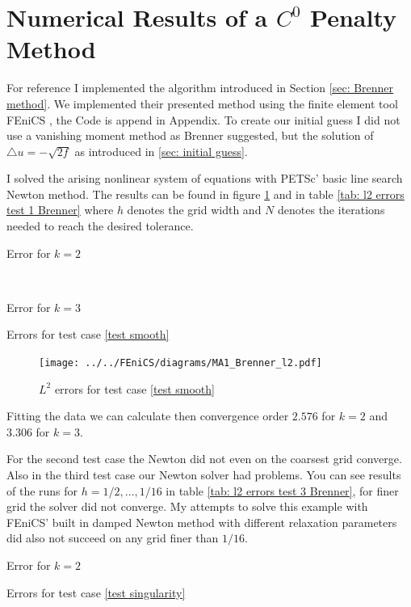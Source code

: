 \section{Numerical Results of a $C^0$ Penalty Method}



For reference I implemented the algorithm introduced in Section \ref{sec: Brenner method}.
We implemented their presented method using the finite element tool FEniCS \cite{FEniCS}, the Code is append in Appendix. 
To create our initial guess I did not use a vanishing moment method as Brenner suggested, but the solution of $\triangle u = -\sqrt{2f}$ as introduced in \ref{sec: initial guess}. 

I solved the arising nonlinear system of equations with PETSc' basic line search Newton method. 
The results can be found in figure \ref{fig: Brenner test1} and in table \ref{tab: l2 errors test 1 Brenner} where $h$ denotes the grid width and $N$ denotes the iterations needed to reach the desired tolerance. 

\begin{table}[h]
	\begin{subtable}[b]{0.45\textwidth}
		\centering
    	\caption{Error for $k=2$}
   \end{subtable}
   ~
	\begin{subtable}[b]{0.45\textwidth}
		\centering
 	\caption{Error for $k=3$}
	\end{subtable}
	\caption{Errors for test case \ref{test smooth}}
	\label{tab: l2 errors test 1 Brenner}
\end{table}
\begin{figure}[h!]
\centering
	\texttt{[image: ../../FEniCS/diagrams/MA1\_Brenner\_l2.pdf]}
	\caption{$L^2$ errors for test case \ref{test smooth}}
	\label{fig: Brenner test1}
\end{figure}
Fitting the data we can calculate then convergence order  $2.576$ for $k=2$ and $3.306$ for $k=3$.

For the second test case the Newton did not even on the coarsest grid converge. Also in the third test case our Newton solver had problems. You can see results of the runs for $h=1/2, \dots, 1/16$ in table \ref{tab: l2 errors test 3 Brenner}, for finer grid the solver did not converge. My attempts to solve this example with FEniCS' built in damped Newton method with different relaxation parameters did also not succeed on any grid finer than $1/16$.
\begin{table}[h]
		\centering
    	\caption{Error for $k=2$}
	\caption{Errors for test case \ref{test singularity}}
	\label{tab: l2 errors test 3 Brenner}
\end{table}

